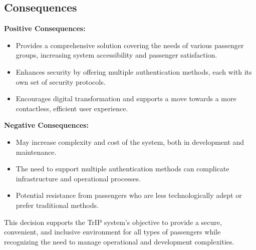 \subsection*{Consequences}
\textbf{Positive Consequences:}
\begin{itemize}
    \item Provides a comprehensive solution covering the needs of various passenger groups, increasing system accessibility and passenger satisfaction.
    \item Enhances security by offering multiple authentication methods, each with its own set of security protocols.
    \item Encourages digital transformation and supports a move towards a more contactless, efficient user experience.
\end{itemize}
\textbf{Negative Consequences:}
\begin{itemize}
    \item May increase complexity and cost of the system, both in development and maintenance.
    \item The need to support multiple authentication methods can complicate infrastructure and operational processes.
    \item Potential resistance from passengers who are less technologically adept or prefer traditional methods.
\end{itemize}
This decision supports the TrIP system's objective to provide a secure, convenient, and inclusive environment for all types of passengers while recognizing the need to manage operational and development complexities.
